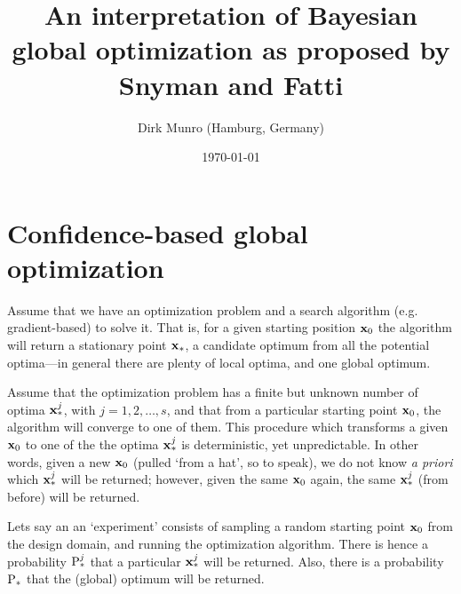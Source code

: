 \documentclass[11pt]{article}
\title{An interpretation of Bayesian global optimization as proposed by Snyman and Fatti \cite{snyman1987}}
\author{Dirk Munro (Hamburg, Germany)}
\date{\today }
\begin{document}
\maketitle

\section{Confidence-based global optimization}

Assume that we have an optimization problem and a search algorithm (e.g. gradient-based) to solve it. That is, for a given starting position $\bx_0$ the algorithm will return a stationary point $\bx_\ast$, a candidate optimum from all the potential optima---in general there are plenty of local optima, and one global optimum. 

Assume that the optimization problem has a finite but unknown number of optima $\bx^j_\ast$, with $j=1,2,\ldots, s$, and that from a particular starting point $\bx_0$, the algorithm will converge to one of them. This procedure which transforms a given $\bx_0$ to one of the the optima $\bx^j_\ast$ is deterministic, yet unpredictable. In other words, given a new $\bx_0$ (pulled `from a hat', so to speak), we do not know \emph{a priori} which $\bx^j_\ast$ will be returned; however, given the same $\bx_0$ again, the same $\bx^j_\ast$ (from before) will be returned.

Lets say an an `experiment' consists of sampling a random starting point $\bx_0$ from the design domain, and running the optimization algorithm. There is hence a probability $\P^j_\ast$ that a particular $\bx^j_\ast$ will be returned. Also, there is a probability $\P_\ast$ that the (global) optimum will be returned.
\end{document}

